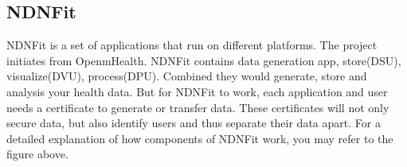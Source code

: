 \documentclass[a0,portrait]{poster}
\begin{document}
\begin{multicols}{2}

\subsection*{NDNFit\cite{zhang2018ndnfit}}
\par
	NDNFit is a set of applications that run on different platforms. 
	The project initiates from OpenmHealth. 
	NDNFit contains data generation app, store(DSU), visualize(DVU), process(DPU). 
	Combined they would generate, store and analysis your health data.
	But for NDNFit to work, each application and user needs a certificate to generate or transfer data.
	These certificates will not only secure data, but also identify users and thus separate their data apart.
	For a detailed explanation of how components of NDNFit work, you may refer to the figure above.



\end{multicols}
\end{document}
